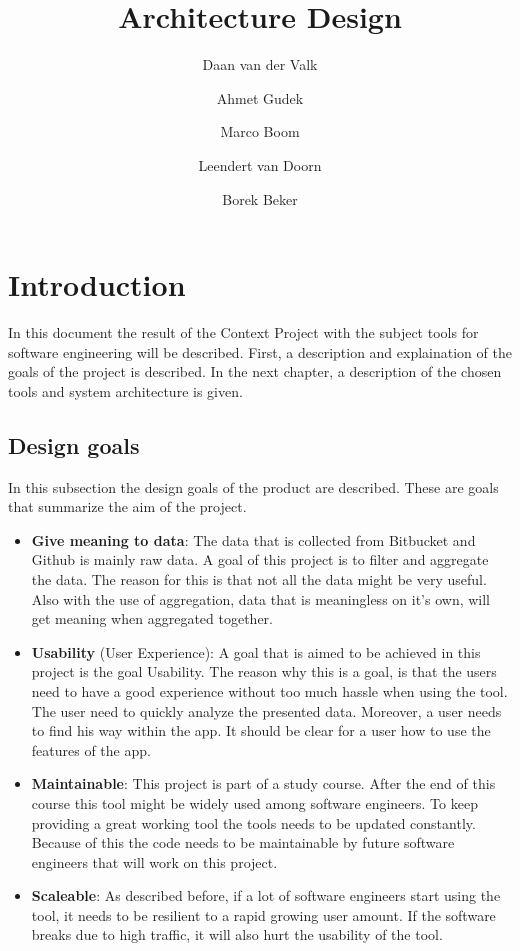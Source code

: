 \documentclass{article}
\title{Architecture Design}
\author{Daan van der Valk\and
Ahmet Gudek\and
Marco Boom\and
Leendert van Doorn\and
Borek Beker}
\begin{document}
\maketitle

\section{Introduction}

In this document the result of the Context Project with the subject tools for software engineering will be described. First, a description and explaination of the goals of the project is described. In the next chapter, a description of the chosen tools and system architecture is given.

\subsection{Design goals}

In this subsection the design goals of the product are described. These are goals that summarize the aim of the project.

\begin{itemize}
    \item \textbf{Give meaning to data}:
    The data that is collected from Bitbucket and Github is mainly raw data. A goal of this project is to filter and aggregate the data. The reason for this is that not all the data might be very useful. Also with the use of aggregation, data that is meaningless on it's own, will get meaning when aggregated together.
    \item \textbf{Usability} (User Experience): A goal that is aimed to be achieved in this project is the goal Usability. The reason why this is a goal, is that the users need to have a good experience without too much hassle when using the tool. The user need to quickly analyze the presented data. Moreover, a user needs to find his way within the app. It should be clear for a user how to use the features of the app.
    \item \textbf{Maintainable}: This project is part of a study course. After the end of this course this tool might be widely used among software engineers. To keep providing a great working tool the tools needs to be updated constantly. Because of this the code needs to be maintainable by future software engineers that will work on this project.
    \item \textbf{Scaleable}: As described before, if a lot of software engineers start using the tool, it needs to be resilient to a rapid growing user amount. If the software breaks due to high traffic, it will also hurt the usability of the tool.
\end{itemize}
\end{document}
